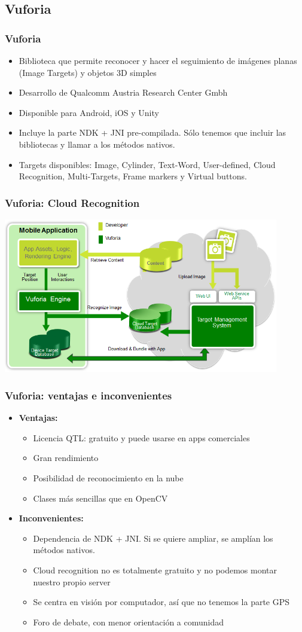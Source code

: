 \subsection*{Vuforia}
\frame
{
\frametitle{Vuforia}
\begin{itemize}
 \item Biblioteca que permite reconocer y hacer el seguimiento de imágenes planas (Image Targets) y objetos 3D simples
 \item Desarrollo de Qualcomm Austria Research Center Gmbh
 \item Disponible para Android, iOS y Unity
 \item Incluye la parte NDK + JNI pre-compilada. Sólo tenemos que incluir las bibliotecas y llamar a los métodos nativos.
 \item Targets disponibles: Image, Cylinder, Text-Word, User-defined, Cloud Recognition, Multi-Targets, Frame markers y Virtual buttons.
\end{itemize}
}

\frame
{
\frametitle{Vuforia: Cloud Recognition}
 \includegraphics[width=12cm]{imgs/vuforia-components.png}
}

\frame
{
\frametitle{Vuforia: ventajas e inconvenientes}
\begin{itemize}
\item \textbf{Ventajas:}
  \begin{itemize}
   \item Licencia QTL: gratuito y puede usarse en apps comerciales
   \item Gran rendimiento
   \item Posibilidad de reconocimiento en la nube
   \item Clases más sencillas que en OpenCV
  \end{itemize}

\item \textbf{Inconvenientes:}
  \begin{itemize}
   \item Dependencia de NDK + JNI. Si se quiere ampliar, se amplían los métodos nativos.
   \item Cloud recognition no es totalmente gratuito y no podemos montar nuestro propio server
   \item Se centra en visión por computador, así que no tenemos la parte GPS
   \item Foro de debate, con menor orientación a comunidad
  \end{itemize}

\end{itemize}
}
